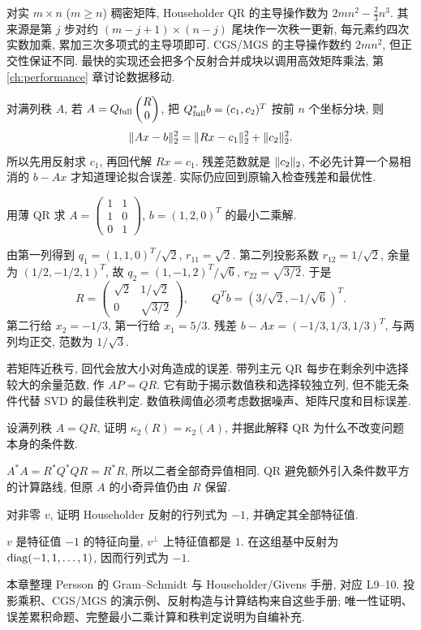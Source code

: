 对实 $m\times n$ ($m\ge n$) 稠密矩阵, Householder QR 的主导操作数为 $2mn^2-\tfrac23n^3$. 其来源是第 $j$ 步对约 $(m-j+1)\times(n-j)$ 尾块作一次秩一更新, 每元素约四次实数加乘, 累加三次多项式的主导项即可. CGS/MGS 的主导操作数约 $2mn^2$, 但正交性保证不同. 最快的实现还会把多个反射合并成块以调用高效矩阵乘法, 第 \ref{ch:performance} 章讨论数据移动.

对满列秩 $A$, 若 $A=Q_{\rm full}\begin{pmatrix}R\\0\end{pmatrix}$, 把 $Q_{\rm full}^*b=(c_1,c_2)^T$ 按前 $n$ 个坐标分块, 则
\[
\lVert Ax-b\rVert_2^2=\lVert Rx-c_1\rVert_2^2+\lVert c_2\rVert_2^2.
\]
所以先用反射求 $c_1$, 再回代解 $Rx=c_1$. 残差范数就是 $\lVert c_2\rVert_2$, 不必先计算一个易相消的 $b-Ax$ 才知道理论拟合误差. 实际仍应回到原输入检查残差和最优性.

\begin{example}
用薄 QR 求 $A=\begin{pmatrix}1&1\\1&0\\0&1\end{pmatrix}$, $b=(1,2,0)^T$ 的最小二乘解.
\end{example}
\begin{solution}
由第一列得到 $q_1=(1,1,0)^T/\sqrt2$, $r_{11}=\sqrt2$. 第二列投影系数 $r_{12}=1/\sqrt2$, 余量为 $(1/2,-1/2,1)^T$, 故 $q_2=(1,-1,2)^T/\sqrt6$, $r_{22}=\sqrt{3/2}$. 于是
\[
R=\begin{pmatrix}\sqrt2&1/\sqrt2\\0&\sqrt{3/2}\end{pmatrix},
\qquad Q^Tb=(3/\sqrt2,-1/\sqrt6)^T.
\]
第二行给 $x_2=-1/3$, 第一行给 $x_1=5/3$. 残差 $b-Ax=(-1/3,1/3,1/3)^T$, 与两列均正交, 范数为 $1/\sqrt3$.
\end{solution}
若矩阵近秩亏, 回代会放大小对角造成的误差. 带列主元 QR 每步在剩余列中选择较大的余量范数, 作 $AP=QR$. 它有助于揭示数值秩和选择较独立列, 但不能无条件代替 SVD 的最佳秩判定. 数值秩阈值必须考虑数据噪声、矩阵尺度和目标误差.

\begin{exercise}
设满列秩 $A=QR$, 证明 $\kappa_2(R)=\kappa_2(A)$, 并据此解释 QR 为什么不改变问题本身的条件数.
\end{exercise}
\begin{solution}
$A^*A=R^*Q^*QR=R^*R$, 所以二者全部奇异值相同. QR 避免额外引入条件数平方的计算路线, 但原 $A$ 的小奇异值仍由 $R$ 保留.
\end{solution}
\begin{exercise}
对非零 $v$, 证明 Householder 反射的行列式为 $-1$, 并确定其全部特征值.
\end{exercise}
\begin{solution}
$v$ 是特征值 $-1$ 的特征向量, $v^\perp$ 上特征值都是 $1$. 在这组基中反射为 $\operatorname{diag}(-1,1,\ldots,1)$, 因而行列式为 $-1$.
\end{solution}
\begin{remark}
本章整理 Persson 的 Gram--Schmidt 与 Householder/Givens 手册, 对应 L9--10. 投影乘积、CGS/MGS 的演示例、反射构造与计算结构来自这些手册; 唯一性证明、误差累积命题、完整最小二乘计算和秩判定说明为自编补充.
\end{remark}
